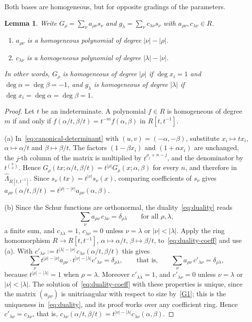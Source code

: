 \documentclass[11pt]{amsart}
\numberwithin{equation}{section}
\newtheorem{lemma}[theorem]{Lemma}
\theoremstyle{definition}
\theoremstyle{remark}
\newcommand{\hLam}{\widehat\Lambda}
\begin{document}
Both bases are homogeneous, but for opposite gradings of the parameters.

\begin{lemma}\label{lem:grading}
Write $G_\rho=\sum_\nu a_{\rho\nu}s_\nu$ and $g_\lambda=\sum_\nu c_{\lambda\nu}s_\nu$
with $a_{\rho\nu},c_{\lambda\nu}\in R$.
\begin{enumerate}[label=\textup{(\alph*)}]
\item $a_{\rho\nu}$ is a homogeneous polynomial of degree $|\nu|-|\rho|$.
\item $c_{\lambda\nu}$ is a homogeneous polynomial of degree $|\lambda|-|\nu|$.
\end{enumerate}
In other words, $G_\rho$ is homogeneous of degree $|\rho|$ if
$\deg x_i=1$ and $\deg\alpha=\deg\beta=-1$, and $g_\lambda$ is homogeneous
of degree $|\lambda|$ if $\deg x_i=\deg\alpha=\deg\beta=1$.
\end{lemma}

\begin{proof}
Let $t$ be an indeterminate. A polynomial $f\in R$ is homogeneous of
degree $m$ if and only if $f(\alpha/t,\beta/t)=t^{-m}f(\alpha,\beta)$ in
$R[t,t^{-1}]$.

(a) In~\eqref{eq:canonical-determinant} with $(u,v)=(-\alpha,-\beta)$,
substitute $x_i\mapsto tx_i$, $\alpha\mapsto\alpha/t$ and
$\beta\mapsto\beta/t$. The factors $(1-\beta x_i)$ and $(1+\alpha x_i)$ are
unchanged, the $j$-th column of the matrix is multiplied by
$t^{\rho_j+n-j}$, and the denominator by $t^{\binom n2}$. Hence
$G_\rho(tx;\alpha/t,\beta/t)=t^{|\rho|}G_\rho(x;\alpha,\beta)$ for every $n$,
and therefore in $\hLam_{R[t,t^{-1}]}$. Since $s_\nu(tx)=t^{|\nu|}s_\nu(x)$,
comparing coefficients of $s_\nu$ gives
$a_{\rho\nu}(\alpha/t,\beta/t)=t^{|\rho|-|\nu|}a_{\rho\nu}(\alpha,\beta)$.

(b) Since the Schur functions are orthonormal, the duality~\eqref{eq:duality}
reads
\begin{equation}\label{eq:duality-coeff}
 \sum_\nu a_{\rho\nu}\,c_{\lambda\nu}=\delta_{\rho\lambda}
 \qquad\text{for all }\rho,\lambda,
\end{equation}
a finite sum, and $c_{\lambda\lambda}=1$, $c_{\lambda\nu}=0$ unless $\nu=\lambda$
or $|\nu|<|\lambda|$. Apply the ring homomorphism $R\to R[t,t^{-1}]$,
$\alpha\mapsto\alpha/t$, $\beta\mapsto\beta/t$, to~\eqref{eq:duality-coeff}
and use (a). With
$c'_{\lambda\nu}:=t^{|\lambda|-|\nu|}\,c_{\lambda\nu}(\alpha/t,\beta/t)$ this gives
\[
 \sum_\nu t^{|\rho|-|\nu|}a_{\rho\nu}\cdot t^{|\nu|-|\lambda|}c'_{\lambda\nu}
 =\delta_{\rho\lambda},
 \qquad\text{that is,}\qquad
 \sum_\nu a_{\rho\nu}\,c'_{\lambda\nu}=\delta_{\rho\lambda},
\]
because $t^{|\rho|-|\lambda|}=1$ when $\rho=\lambda$. Moreover
$c'_{\lambda\lambda}=1$, and $c'_{\lambda\nu}=0$ unless $\nu=\lambda$ or
$|\nu|<|\lambda|$. The solution of~\eqref{eq:duality-coeff} with these
properties is unique, since the matrix $(a_{\rho\nu})$ is unitriangular with
respect to size by~\ref{G1}; this is the uniqueness in~\eqref{eq:duality},
and its proof works over any coefficient ring. Hence
$c'_{\lambda\nu}=c_{\lambda\nu}$, that is,
$c_{\lambda\nu}(\alpha/t,\beta/t)=t^{|\nu|-|\lambda|}c_{\lambda\nu}(\alpha,\beta)$.
\end{proof}
\end{document}
